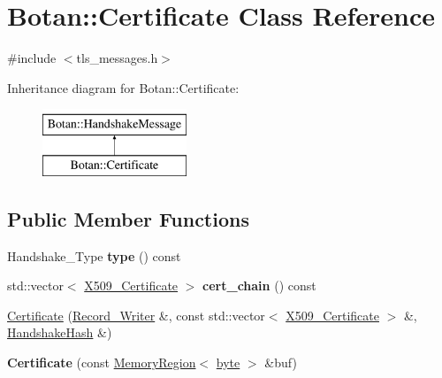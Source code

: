 \hypertarget{classBotan_1_1Certificate}{\section{Botan\-:\-:Certificate Class Reference}
\label{classBotan_1_1Certificate}
}


{\ttfamily \#include $<$tls\-\_\-messages.\-h$>$}

Inheritance diagram for Botan\-:\-:Certificate\-:\begin{figure}[H]
\begin{center}
\leavevmode
\includegraphics[height=2.000000cm]{classBotan_1_1Certificate}
\end{center}
\end{figure}
\subsection*{Public Member Functions}
\begin{DoxyCompactItemize}
\item 
\hypertarget{classBotan_1_1Certificate_a32d885c594853572351c69cda06d2391}{Handshake\-\_\-\-Type {\bfseries type} () const }\label{classBotan_1_1Certificate_a32d885c594853572351c69cda06d2391}

\item 
\hypertarget{classBotan_1_1Certificate_a623e51409d18541257392f369884663f}{std\-::vector$<$ \hyperlink{classBotan_1_1X509__Certificate}{X509\-\_\-\-Certificate} $>$ {\bfseries cert\-\_\-chain} () const }\label{classBotan_1_1Certificate_a623e51409d18541257392f369884663f}

\item 
\hyperlink{classBotan_1_1Certificate_a2eac15f186af6771dce322db6385f068}{Certificate} (\hyperlink{classBotan_1_1Record__Writer}{Record\-\_\-\-Writer} \&, const std\-::vector$<$ \hyperlink{classBotan_1_1X509__Certificate}{X509\-\_\-\-Certificate} $>$ \&, \hyperlink{classBotan_1_1HandshakeHash}{Handshake\-Hash} \&)
\item 
\hypertarget{classBotan_1_1Certificate_ac74a50caa81654b062562a5f15ecc47c}{{\bfseries Certificate} (const \hyperlink{classBotan_1_1MemoryRegion}{Memory\-Region}$<$ \hyperlink{namespaceBotan_a7d793989d801281df48c6b19616b8b84}{byte} $>$ \&buf)}\label{classBotan_1_1Certificate_ac74a50caa81654b062562a5f15ecc47c}

\end{DoxyCompactItemize}


